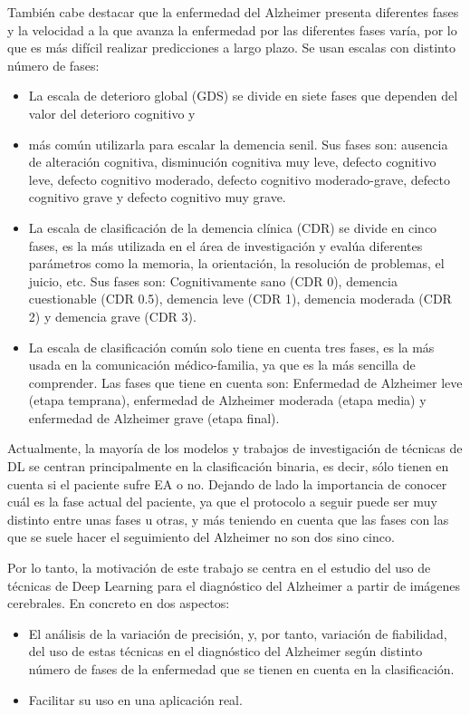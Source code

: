 También cabe destacar que la enfermedad del Alzheimer presenta diferentes fases y la velocidad a la que avanza la
enfermedad por las diferentes fases varía, por lo que es más difícil realizar predicciones a largo plazo.
Se usan escalas con distinto número de fases:
\begin{itemize}
    \item La escala de deterioro global (GDS) se divide en siete fases que dependen del valor del deterioro cognitivo y
    \item más común utilizarla para escalar la demencia senil.
    Sus fases son: ausencia de alteración cognitiva, disminución cognitiva muy leve, defecto cognitivo leve, defecto
    cognitivo moderado, defecto cognitivo moderado-grave, defecto cognitivo grave y defecto cognitivo muy grave.
    \item La escala de clasificación de la demencia clínica (CDR)  se divide en cinco fases, es la más utilizada en el
    área de investigación y evalúa diferentes parámetros como la memoria, la orientación, la resolución de problemas,
    el juicio, etc.
    Sus fases son: Cognitivamente sano (CDR 0), demencia cuestionable (CDR 0.5), demencia leve (CDR 1), demencia
    moderada (CDR 2) y demencia grave (CDR 3).
    \item La escala de clasificación común solo tiene en cuenta tres fases, es la más usada en la comunicación
    médico-familia, ya que es la más sencilla de comprender.
    Las fases que tiene en cuenta son: Enfermedad de Alzheimer leve (etapa temprana), enfermedad de Alzheimer moderada
    (etapa media) y enfermedad de Alzheimer grave (etapa final).\\
\end{itemize}


Actualmente, la mayoría de los modelos y trabajos de investigación de técnicas de DL se centran principalmente en la
clasificación binaria, es decir, sólo tienen en cuenta si el paciente sufre EA o no.
Dejando de lado la importancia de conocer cuál es la fase actual del paciente, ya que el protocolo a seguir puede ser
muy distinto entre unas fases u otras, y más teniendo en cuenta que las fases con las que se suele hacer el seguimiento
del Alzheimer no son dos sino cinco.

Por lo tanto, la motivación de este trabajo se centra en el estudio del uso de técnicas de Deep Learning para el
diagnóstico del Alzheimer a partir de imágenes cerebrales.
En concreto en dos aspectos:
\begin{itemize}
    \item El análisis de la variación de precisión, y, por tanto, variación de fiabilidad, del uso de estas técnicas en
    el diagnóstico del Alzheimer según distinto número de fases de la enfermedad que se tienen en cuenta en la
    clasificación.
    \item Facilitar su uso en una aplicación real. \\
\end{itemize}